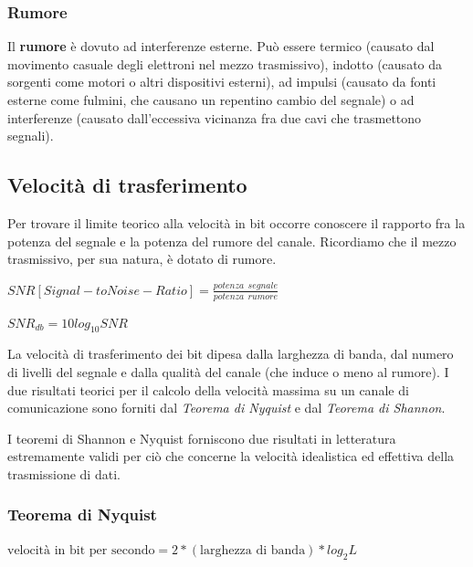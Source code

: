         \subsubsection{Rumore}
        
            Il \textbf{rumore} è dovuto ad interferenze esterne. Può essere termico (causato dal movimento casuale degli elettroni nel mezzo trasmissivo), indotto (causato da sorgenti come motori o altri dispositivi esterni), ad impulsi (causato da fonti esterne come fulmini, che causano un repentino cambio del segnale) o ad interferenze (causato dall'eccessiva vicinanza fra due cavi che trasmettono segnali).
    
    \subsection{Velocità di trasferimento}
    
        Per trovare il limite teorico alla velocità in bit occorre conoscere il rapporto fra la potenza del segnale e la potenza del rumore del canale. Ricordiamo che il mezzo trasmissivo, per sua natura, è dotato di rumore.
    
        \begin{center}
            \(SNR[Signal-toNoise-Ratio] = \frac{potenza\ \ segnale}{potenza\ \ rumore}\)
            
            \vspace{3mm}
            
            \(SNR_{db} = 10 log_{10} SNR\)
        \end{center}
        
        La velocità di trasferimento dei bit dipesa dalla larghezza di banda, dal numero di livelli del segnale e dalla qualità del canale (che induce o meno al rumore). I due risultati teorici per il calcolo della velocità massima su un canale di comunicazione sono forniti dal \textit{Teorema di Nyquist} e dal \textit{Teorema di Shannon}.
        
        I teoremi di Shannon e Nyquist forniscono due risultati in letteratura estremamente validi per ciò che concerne la velocità idealistica ed effettiva della trasmissione di dati.
        
        \subsubsection{Teorema di Nyquist}
        
            \(\text{velocità in bit per secondo}=2*(\text{larghezza di banda})*log_2 L\)
            
